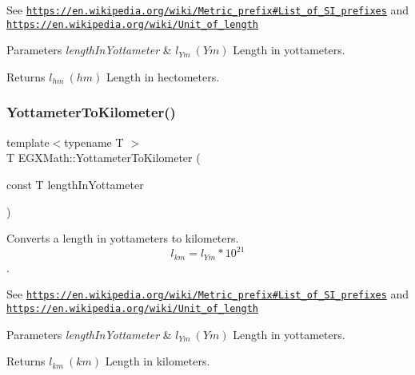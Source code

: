See \href{https://en.wikipedia.org/wiki/Metric_prefix#List_of_SI_prefixes}{\tt https\+://en.\+wikipedia.\+org/wiki/\+Metric\+\_\+prefix\#\+List\+\_\+of\+\_\+\+S\+I\+\_\+prefixes} and \href{https://en.wikipedia.org/wiki/Unit_of_length}{\tt https\+://en.\+wikipedia.\+org/wiki/\+Unit\+\_\+of\+\_\+length} 
\begin{DoxyParams}{Parameters}
{\em length\+In\+Yottameter} & $ l_{Ym}\ (Ym)$ Length in yottameters. \\
\hline
\end{DoxyParams}
\begin{DoxyReturn}{Returns}
$ l_{hm}\ (hm)$ Length in hectometers. 
\end{DoxyReturn}
\mbox{\label{group___e_g_x_math-_conversions-_length_conversions-_s_i-_yottameter-_s_i_ga3de441b3e33fe175b75425711d1b92e1}} 
\subsubsection{\texorpdfstring{Yottameter\+To\+Kilometer()}{YottameterToKilometer()}}
{\footnotesize\ttfamily template$<$typename T $>$ \\
T E\+G\+X\+Math\+::\+Yottameter\+To\+Kilometer (\begin{DoxyParamCaption}\item[{const T}]{length\+In\+Yottameter }\end{DoxyParamCaption})}



Converts a length in yottameters to kilometers. \[ l_{km}=l_{Ym} * 10^{21} \]. 

See \href{https://en.wikipedia.org/wiki/Metric_prefix#List_of_SI_prefixes}{\tt https\+://en.\+wikipedia.\+org/wiki/\+Metric\+\_\+prefix\#\+List\+\_\+of\+\_\+\+S\+I\+\_\+prefixes} and \href{https://en.wikipedia.org/wiki/Unit_of_length}{\tt https\+://en.\+wikipedia.\+org/wiki/\+Unit\+\_\+of\+\_\+length} 
\begin{DoxyParams}{Parameters}
{\em length\+In\+Yottameter} & $ l_{Ym}\ (Ym)$ Length in yottameters. \\
\hline
\end{DoxyParams}
\begin{DoxyReturn}{Returns}
$ l_{km}\ (km)$ Length in kilometers. 
\end{DoxyReturn}
\mbox{\label{group___e_g_x_math-_conversions-_length_conversions-_s_i-_yottameter-_s_i_ga6c00035c9e60ba95c4670d34aef3ec2a}} 
